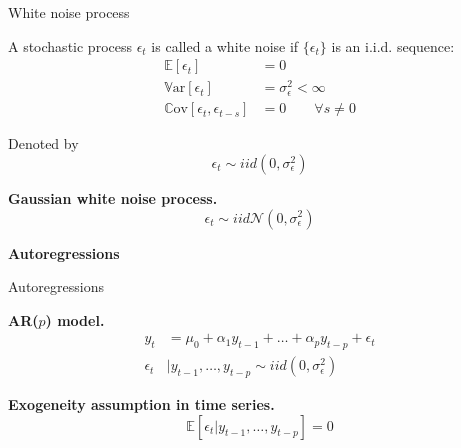 \documentclass[notes,blackandwhite,mathsans]{beamer}
\begin{document}
\begin{frame}{White noise process}

{\color{mcxs2}A stochastic process} $\epsilon_t$ {\color{mcxs2}is called a} {\color{mcxs2}white noise} {\color{mcxs2}if} $\{\epsilon_t\}$ {\color{mcxs2}is an i.i.d. sequence:}
\begin{align*}
\mathbb{E}[\epsilon_t] &= 0 \\
\mathbb{V}\text{ar}[\epsilon_t] &= \sigma_{\epsilon}^2  < \infty \\
\mathbb{C}\text{ov}[\epsilon_t, \epsilon_{t-s}] &= 0 \qquad \forall s\neq0
\end{align*}

{\color{mcxs2}Denoted by}
$$ \epsilon_t \sim iid\left(0,\sigma_{\epsilon}^2 \right) $$

\bigskip\textbf{Gaussian white noise process.}
$$ \epsilon_t \sim iid\mathcal{N}\left(0,\sigma_{\epsilon}^2 \right) $$

\end{frame}








{
\begin{frame}

\begin{adjustwidth}{-0.5cm}{0cm}
\vspace{8.3cm}\Large
\textbf{{\color{mcxs2}Autoregressions} {\color{white}}}
\end{adjustwidth}

\end{frame}
}



\begin{frame}{Autoregressions}

\textbf{AR($p$) model.}
\begin{align*}
y_t &= \mu_0 + \alpha_1y_{t-1} + \dots + \alpha_p y_{t-p} + \epsilon_t  \\
\epsilon_t&|y_{t-1},\dots, y_{t-p} \sim iid(0,\sigma_{\epsilon}^2)
\end{align*}

\bigskip\textbf{Exogeneity assumption in time series.}
$$ \mathbb{E}[\epsilon_t|y_{t-1},\dots, y_{t-p}] = 0 $$


\end{frame}
\end{document}
